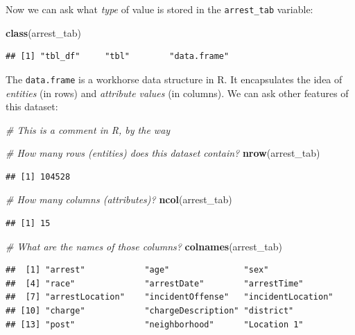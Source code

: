 \documentclass[12pt,]{book}
\newenvironment{Shaded}{\begin{snugshade}}{\end{snugshade}}
\newcommand{\KeywordTok}[1]{\textcolor[rgb]{0.13,0.29,0.53}{\textbf{#1}}}
\newcommand{\CommentTok}[1]{\textcolor[rgb]{0.56,0.35,0.01}{\textit{#1}}}
\newcommand{\NormalTok}[1]{#1}
\theoremstyle{definition}
\theoremstyle{definition}
\theoremstyle{definition}
\theoremstyle{remark}
\begin{document}
Now we can ask what \emph{type} of value is stored in the
\texttt{arrest\_tab} variable:

\begin{Shaded}
\begin{Highlighting}[]
\KeywordTok{class}\NormalTok{(arrest_tab)}
\end{Highlighting}
\end{Shaded}

\begin{verbatim}
## [1] "tbl_df"     "tbl"        "data.frame"
\end{verbatim}

The \texttt{data.frame} is a workhorse data structure in R. It
encapsulates the idea of \emph{entities} (in rows) and \emph{attribute
values} (in columns). We can ask other features of this dataset:

\begin{Shaded}
\begin{Highlighting}[]
\CommentTok{# This is a comment in R, by the way}

\CommentTok{# How many rows (entities) does this dataset contain?}
\KeywordTok{nrow}\NormalTok{(arrest_tab)}
\end{Highlighting}
\end{Shaded}

\begin{verbatim}
## [1] 104528
\end{verbatim}

\begin{Shaded}
\begin{Highlighting}[]
\CommentTok{# How many columns (attributes)?}
\KeywordTok{ncol}\NormalTok{(arrest_tab)}
\end{Highlighting}
\end{Shaded}

\begin{verbatim}
## [1] 15
\end{verbatim}

\begin{Shaded}
\begin{Highlighting}[]
\CommentTok{# What are the names of those columns?}
\KeywordTok{colnames}\NormalTok{(arrest_tab)}
\end{Highlighting}
\end{Shaded}

\begin{verbatim}
##  [1] "arrest"            "age"               "sex"              
##  [4] "race"              "arrestDate"        "arrestTime"       
##  [7] "arrestLocation"    "incidentOffense"   "incidentLocation" 
## [10] "charge"            "chargeDescription" "district"         
## [13] "post"              "neighborhood"      "Location 1"
\end{verbatim}
\end{document}
